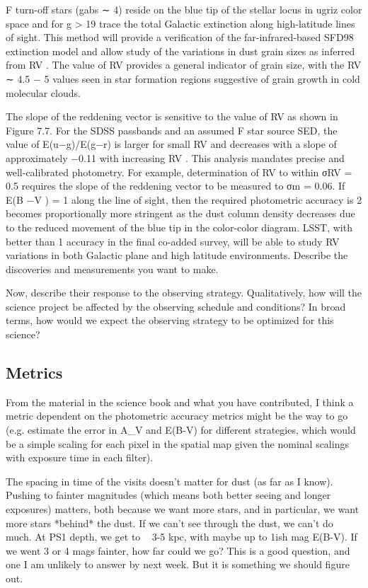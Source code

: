 F turn-off stars (gabs ∼ 4) reside on the blue tip of the stellar locus in ugriz color space and for
g > 19 trace the total Galactic extinction along high-latitude lines of sight. This method will
provide a verification of the far-infrared-based SFD98 extinction model and allow study of the
variations in dust grain sizes as inferred from RV . The value of RV provides a general indicator of
grain size, with the RV ∼ 4.5 − 5 values seen in star formation regions suggestive of grain growth
in cold molecular clouds.

The slope of the reddening vector is sensitive to the value of RV as shown in Figure 7.7. For the
SDSS passbands and an assumed F star source SED, the value of E(u−g)/E(g−r) is larger for small
RV and decreases with a slope of approximately −0.11 with increasing RV . This analysis mandates
precise and well-calibrated photometry. For example, determination of RV to within σRV = 0.5
requires the slope of the reddening vector to be measured to σm = 0.06. If E(B −V ) = 1 along the
line of sight, then the required photometric accuracy is 2%
becomes proportionally more stringent as the dust column density decreases due to the reduced
movement of the blue tip in the color-color diagram. LSST, with better than 1%
accuracy in the final co-added survey, will be able to study RV variations in both Galactic plane
and high latitude environments.
Describe the discoveries and measurements you want to make.

Now, describe their response to the observing strategy. Qualitatively,
how will the science project be affected by the observing schedule and
conditions? In broad terms, how would we expect the observing strategy
to be optimized for this science?



\subsection{Metrics}
\label{sec:\secname:metrics}
 From the material in the science book and what you have contributed, I think a metric dependent on the photometric accuracy metrics might be the way to go (e.g. estimate the error in A_V and E(B-V) for different strategies, which would be a simple scaling for each pixel in the spatial map given the nominal scalings with exposure time in each filter).

The spacing in time of the visits doesn't matter for dust (as far as I know). 
Pushing to fainter magnitudes (which means both better seeing and longer exposures) matters, both because we want more stars, and in particular, we want more stars *behind* the dust.  If we can't see through the dust, we can't do much.  At PS1 depth, we get to ~ 3-5 kpc, with maybe up to 1ish mag E(B-V).  If we went 3 or 4 mags fainter, how far could we go?  This is a good question, and one I am unlikely to answer by next week.  But it is something we should figure out. 

